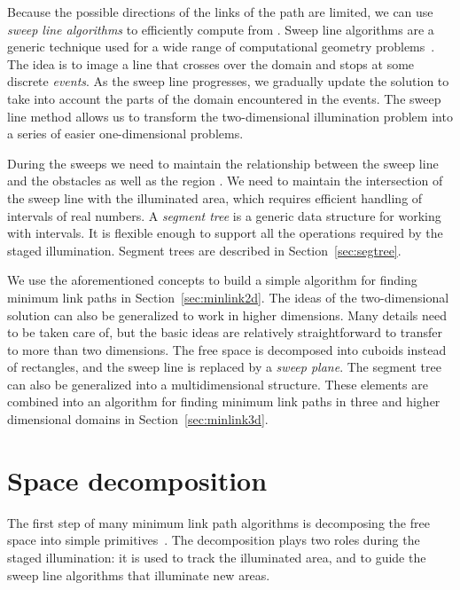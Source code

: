 \documentclass[english,gradu]{tktltiki2018}
\begin{document}
Because the possible directions of the links of the path are limited, we can use \emph{sweep line algorithms} to efficiently compute  from .
Sweep line algorithms are a generic technique used for a wide range of computational geometry problems~\cite[Section 33.2]{clrs}.
The idea is to image a line that crosses over the domain and stops at some discrete \emph{events}.
As the sweep line progresses, we gradually update the solution to take into account the parts of the domain encountered in the events.
The sweep line method allows us to transform the two-dimensional illumination problem into a series of easier one-dimensional problems.

During the sweeps we need to maintain the relationship between the sweep line and the obstacles as well as the region .
We need to maintain the intersection of the sweep line with the illuminated area, which requires efficient handling of intervals of real numbers.
A \emph{segment tree} is a generic data structure for working with intervals.
It is flexible enough to support all the operations required by the staged illumination.
Segment trees are described in Section~\ref{sec:segtree}.

We use the aforementioned concepts to build a simple algorithm for finding minimum link paths in Section~\ref{sec:minlink2d}.
The ideas of the two-dimensional solution can also be generalized to work in higher dimensions.
Many details need to be taken care of, but the basic ideas are relatively straightforward to transfer to more than two dimensions.
The free space is decomposed into cuboids instead of rectangles, and the sweep line is replaced by a \emph{sweep plane}.
The segment tree can also be generalized into a multidimensional structure.
These elements are combined into an algorithm for finding minimum link paths in three and higher dimensional domains in Section~\ref{sec:minlink3d}.



\section{Space decomposition}\label{sec:decomposition}

The first step of many minimum link path algorithms is decomposing the free space into simple primitives~\cite{dasnar,imai86,revisited}.
The decomposition plays two roles during the staged illumination:
it is used to track the illuminated area, and to guide the sweep line algorithms that illuminate new areas.
\end{document}
